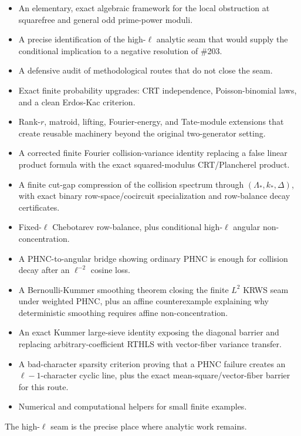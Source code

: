 \documentclass[11pt]{article}
\newcommand{\1}{\mathbf 1}
\begin{document}
\begin{itemize}[leftmargin=2em]
\item An elementary, exact algebraic framework for the local obstruction at squarefree and general odd prime-power moduli.
\item A precise identification of the high-\(\ell\) analytic seam that would supply the conditional implication to a negative resolution of \#203.
\item A defensive audit of methodological routes that do not close the seam.
\item Exact finite probability upgrades: CRT independence, Poisson-binomial laws, and a clean Erdos-Kac criterion.
\item Rank-\(r\), matroid, lifting, Fourier-energy, and Tate-module extensions that create reusable machinery beyond the original two-generator setting.
\item A corrected finite Fourier collision-variance identity replacing a false linear product formula with the exact squared-modulus CRT/Plancherel product.
\item A finite cut-gap compression of the collision spectrum through \((\Lambda_*,k_*,\Delta)\), with exact binary row-space/cocircuit specialization and row-balance decay certificates.
\item Fixed-\(\ell\) Chebotarev row-balance, plus conditional high-\(\ell\) angular non-concentration.
\item A PHNC-to-angular bridge showing ordinary PHNC is enough for collision decay after an \(\ell^{-2}\) cosine loss.
\item A Bernoulli-Kummer smoothing theorem closing the finite \(L^2\) KRWS seam under weighted PHNC, plus an affine counterexample explaining why deterministic smoothing requires affine non-concentration.
\item An exact Kummer large-sieve identity exposing the diagonal barrier and replacing arbitrary-coefficient RTHLS with vector-fiber variance transfer.
\item A bad-character sparsity criterion proving that a PHNC failure creates an \(\ell-1\)-character cyclic line, plus the exact mean-square/vector-fiber barrier for this route.
\item Numerical and computational helpers for small finite examples.
\end{itemize}

The high-\(\ell\) seam is the precise place where analytic work remains.
\end{document}
